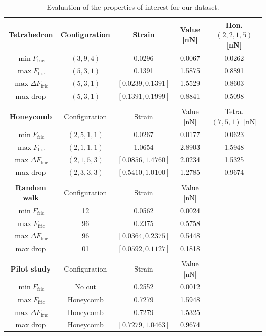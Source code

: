 \begin{table}[H]
  \begin{center}
  \caption{Evaluation of the properties of interest for our dataset.}
  \label{tab:data_properties}
  \begin{tabular}{| c | c | c | c | c |} \hline
  \textbf{Tetrahedron} & Configuration & Strain & Value [nN] & Hon. $(2,2,1,5)$ [nN]  \\ \hline
  $\min F_{\text{fric}}$ & $(3,9,4)$ &  0.0296 & 0.0067 & 0.0262 \\ \hline
  $\max F_{\text{fric}}$ & $(5,3,1)$ & 0.1391 & 1.5875 & 0.8891 \\ \hline
  $\max \Delta F_{\text{fric}}$  & $(5, 3, 1)$ & $[0.0239, 0.1391]$ & 1.5529 & 0.8603  \\ \hline
  max drop & $(5,3,1)$ & $[0.1391, 0.1999]$ & 0.8841 & 0.5098 \\ \hline
  \multicolumn{5}{c}{} \\ \hline
  \textbf{Honeycomb} & Configuration & Strain & Value [nN]  & Tetra. $(7,5,1)$ [nN]  \\ \hline
  $\min F_{\text{fric}}$ & $(2, 5, 1, 1)$ &  0.0267 & 0.0177 & 0.0623 \\ \hline
  $\max F_{\text{fric}}$ & $(2, 1, 1, 1)$ & 1.0654 & 2.8903 & 1.5948 \\ \hline
  $\max \Delta F_{\text{fric}}$  & $(2, 1, 5, 3)$ & $[0.0856, 1.4760]$ & 2.0234 & 1.5325 \\ \hline
  max drop & $(2, 3, 3, 3)$ & $[0.5410, 1.0100]$ & 1.2785 & 0.9674\\ \hline
  \multicolumn{5}{c}{} \\ \cline{1-4}
  \textbf{Random walk} & Configuration & Strain & Value [nN] & \multicolumn{1}{c}{} \\ \cline{1-4}
  $\min F_{\text{fric}}$ & 12 &  0.0562 & 0.0024& \multicolumn{1}{c}{} \\ \cline{1-4}
  $\max F_{\text{fric}}$ & 96 & 0.2375 & 0.5758 & \multicolumn{1}{c}{} \\ \cline{1-4}
  $\max \Delta F_{\text{fric}}$  & 96 & $[0.0364, 0.2375]$ & 0.5448 & \multicolumn{1}{c}{} \\ \cline{1-4}
  max drop & 01 & $[0.0592, 0.1127]$ & 0.1818 & \multicolumn{1}{c}{} \\ \cline{1-4}
  \multicolumn{5}{c}{} \\ \cline{1-4}
  \textbf{Pilot study} & Configuration & Strain & Value [nN]  & \multicolumn{1}{c}{} \\ \cline{1-4}
  $\min F_{\text{fric}}$ & No cut & 0.2552 & 0.0012 & \multicolumn{1}{c}{} \\ \cline{1-4}
  $\max F_{\text{fric}}$ & Honeycomb & 0.7279 & 1.5948 & \multicolumn{1}{c}{} \\ \cline{1-4}
  $\max \Delta F_{\text{fric}}$  & Honeycomb & 0.7279 & 1.5325 & \multicolumn{1}{c}{} \\ \cline{1-4}
  max drop & Honeycomb & $[0.7279, 1.0463]$ & 0.9674 & \multicolumn{1}{c}{} \\ \cline{1-4}
\end{tabular}
\end{center}
\end{table}



